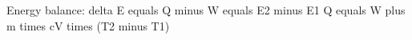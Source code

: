 Energy balance: delta E equals Q minus W equals E2 minus E1  
Q equals W plus m times cV times (T2 minus T1)